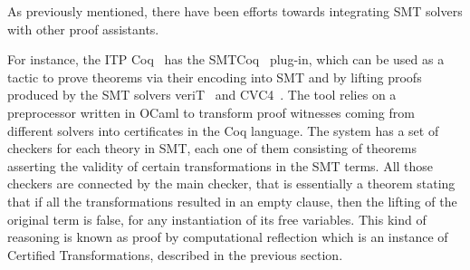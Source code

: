 As previously mentioned, there have been efforts towards integrating SMT solvers
with other proof assistants.

For instance, the ITP Coq~\cite{Bertot2004} has the SMTCoq~\cite{smtcoq}
plug-in, which can be used as a tactic to prove theorems via their encoding into
SMT and by lifting proofs produced by the SMT solvers veriT~\cite{Bouton2009}
and CVC4~\cite{Barrett2011}. The tool relies on a preprocessor written in OCaml
to transform proof witnesses coming from different solvers into certificates in
the Coq language. The system has a set of checkers for each theory in SMT, each
one of them consisting of theorems asserting the validity of certain transformations
in the SMT terms. All those checkers are connected by the main checker, that
is essentially a theorem stating that if all the transformations resulted in an
empty clause, then the lifting of the original term is false, for any instantiation
of its free variables. This kind of reasoning is known as proof by computational
reflection which is an instance of Certified Transformations, described in the
previous section.
